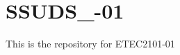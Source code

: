 \chapter{SSUDS\+\_-\/01}
\hypertarget{md__r_e_a_d_m_e}{}\label{md__r_e_a_d_m_e}
\label{md__r_e_a_d_m_e_autotoc_md0}%
%


This is the repository for ETEC2101-\/01 